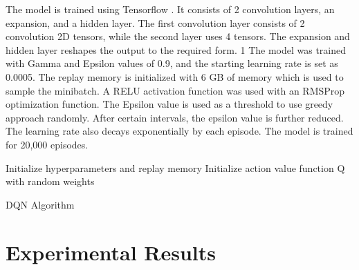 \documentclass{svproc}
\begin{document}
    The model is trained using Tensorflow \cite{tensorflow}. It consists of 2 convolution layers, an expansion, and a hidden layer. The first convolution layer consists of 2 convolution 2D tensors, while the second layer uses 4 tensors. The expansion and hidden layer reshapes the output to the required form. 
    			1
    The model was trained with Gamma and Epsilon values of 0.9, and the starting learning rate is set as 0.0005. The replay memory is initialized with 6 GB of memory which is used to sample the minibatch. A RELU activation function was used with an RMSProp optimization function. The Epsilon value is used as a threshold to use greedy approach randomly. After certain intervals, the epsilon value is further reduced. The learning rate also decays exponentially by each episode. The model is trained for 20,000 episodes.
		
    \begin{algorithm}[t]
        \SetAlgoLined
        Initialize hyperparameters and replay memory\;
        Initialize action value function Q with random weights\;	
        \caption{DQN Algorithm}
    \end{algorithm}

    \section{Experimental Results}
  
\end{document}
